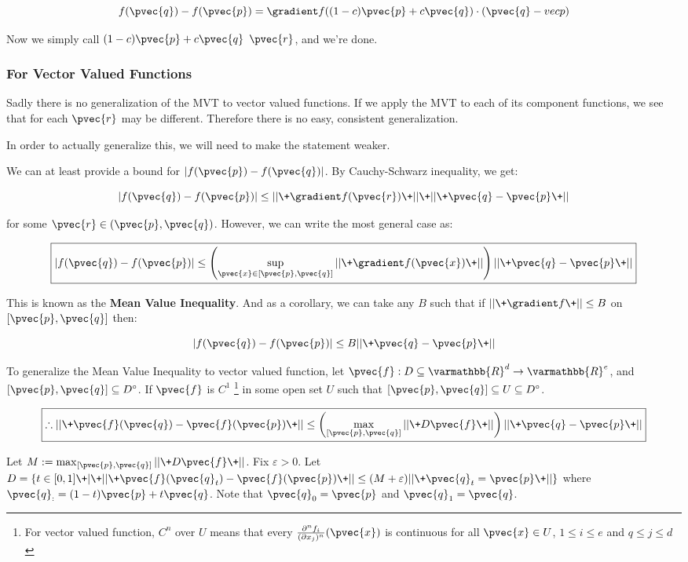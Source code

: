 \documentclass[11 pt, twoside]{article}
\begin{document}
$$f(\pvec{q}) - f(\pvec{p}) = \gradient f((1 - c) \pvec{p} + c\pvec{q}) \cdot
(\pvec{q} - vec{p})$$

Now we simply call $(1 - c)\pvec{p} + c\pvec{q}$ $\pvec{r}$, and we're done.

\subsubsection{For Vector Valued Functions}

Sadly there is no generalization of the MVT to vector valued functions. If we
apply the MVT to each of its component functions, we see that for each $\pvec{r}$
may be different. Therefore there is no easy, consistent generalization.

In order to actually generalize this, we will need to make the statement weaker.

We can at least provide a bound for $|f(\pvec{p}) - f(\pvec{q})|$. By
Cauchy-Schwarz inequality, we get:

$$|f(\pvec{q}) - f(\pvec{p})| \leq ||\+\gradient f(\pvec{r})\+||\+ ||\+\pvec{q} -
\pvec{p}\+||$$

for some $\pvec{r} \in (\pvec{p}, \pvec{q})$. However, we can write the most
general case as:

$$\boxed{|f(\pvec{q}) - f(\pvec{p})| \leq \left(\sup_{\pvec{x} \in [\pvec{p} , \pvec{q}]}
||\+\gradient f(\pvec{x})\+||\right) ||\+\pvec{q} - \pvec{p}\+||}$$

This is known as the \textbf{Mean Value Inequality}. And as a corollary, we can
take any $B$ such that if $ ||\+\gradient f\+|| \leq B$ on $[\pvec{p}, \pvec{q}]$
then:

$$|f(\pvec{q}) - f(\pvec{p})| \leq B ||\+\pvec{q} - \pvec{p}\+||$$

To generalize the Mean Value Inequality to vector valued function, let $\pvec{f}:
D \subseteq \varmathbb{R}^d \to \varmathbb{R}^e$, and $[\pvec{p}, \pvec{q}]
\subseteq D^\circ$. If $\pvec{f}$ is $C^1$ \footnote{For vector valued function,
$C^n$ over $U$ means that every $\frac{\partial^n f_i}{(\partial x_j)^n}(\pvec{x})$ is
continuous for all $\pvec{x} \in U$, $1 \leq i \leq e$ and $q \leq j \leq d$} in
some open set $U$ such that $[\pvec{p}, \pvec{q}] \subseteq U \subseteq D^\circ$.

$$\boxed{\therefore ||\+\pvec{f}(\pvec{q}) - \pvec{f}(\pvec{p})\+|| \leq
\left(\max_{[\pvec{p}, \pvec{q}]} ||\+D\pvec{f}\+||\right) ||\+\pvec{q} -
\pvec{p}\+||}$$

Let $M := \max_{[\pvec{p}, \pvec{q}]} ||\+D\pvec{f}\+||$. Fix $\varepsilon > 0$.
Let $D = \{t \in [0, 1] \+|\+ ||\+\pvec{f}(\pvec{q}_t) - \pvec{f}(\pvec{p})\+|| \leq
(M + \varepsilon) ||\+\pvec{q}_t = \pvec{p}\+||\}$ where $\pvec{q}_:= (1 -
t)\pvec{p} + t\pvec{q}$. Note that $\pvec{q}_0 = \pvec{p}$ and $\pvec{q}_1 =
\pvec{q}$.
\end{document}
